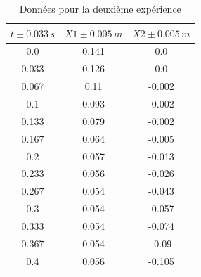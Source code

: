 \documentclass[12pt]{article}
\begin{document}
\begin{table}[h!]
	\begin{center}
		\begin{tabular}{|c|c|c|}
		\hline
		$t\pm 0.033\, s$ & $X1\pm 0.005\, m$ & $X2\pm 0.005\, m$\\
		\hline
		0.0 & 0.141 & 0.0 \\ 
0.033 & 0.126 & 0.0 \\ 
0.067 & 0.11 & -0.002 \\ 
0.1 & 0.093 & -0.002 \\ 
0.133 & 0.079 & -0.002 \\ 
0.167 & 0.064 & -0.005 \\ 
0.2 & 0.057 & -0.013 \\ 
0.233 & 0.056 & -0.026 \\ 
0.267 & 0.054 & -0.043 \\ 
0.3 & 0.054 & -0.057 \\ 
0.333 & 0.054 & -0.074 \\ 
0.367 & 0.054 & -0.09 \\ 
0.4 & 0.056 & -0.105 \\ 	
\hline
		\end{tabular}
		\label{Données2}
		\caption{Données pour la deuxième expérience}
	\end{center}
\end{table}
\end{document}

